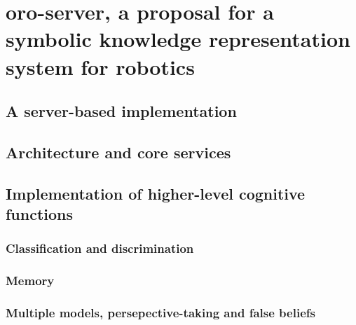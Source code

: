 \chapter{oro-server, a proposal for a symbolic knowledge representation system for robotics}
\label{chapter|oroserver}

\section{ A server-based implementation}
\label{sect|oro-serverbased}

\section{ Architecture and core services}
\label{sect|oro-core}


\section{ Implementation of higher-level cognitive functions}
\label{sect|high-level-cognition}

\subsection{Classification and discrimination}
\label{subssect|discrimination}

\subsection{Memory}
\label{subssect|memory}

\subsection{Multiple models, persepective-taking and false beliefs}
\label{subssect|alterite}
